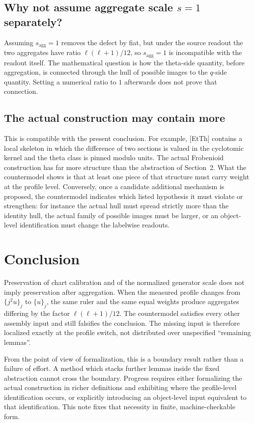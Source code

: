 \documentclass[11pt]{article}
\theoremstyle{definition}
\begin{document}
\subsection{Why not assume aggregate scale $s=1$ separately?}

Assuming $s_{\mathrm{agg}}=1$ removes the defect by fiat, but
under the source readout the two aggregates have ratio
$\ell(\ell+1)/12$, so $s_{\mathrm{agg}}=1$ is incompatible with
the readout itself.  The mathematical question is how the
theta-side quantity, before aggregation, is connected through
the hull of possible images to the $q$-side quantity.  Setting
a numerical ratio to $1$ afterwards does not prove that
connection.

\subsection{The actual construction may contain more}

This is compatible with the present conclusion.  For example,
[EtTh] contains a local skeleton in which the difference of two
sections is valued in the cyclotomic kernel and the theta class
is pinned modulo units.  The actual Frobenioid construction has
far more structure than the abstraction of Section~2.  What the
countermodel shows is that at least one piece of that structure
must carry weight at the profile level.  Conversely, once a
candidate additional mechanism is proposed, the countermodel
indicates which listed hypothesis it must violate or strengthen:
for instance the actual hull must spread strictly more than the
identity hull, the actual family of possible images must be
larger, or an object-level identification must change the
labelwise readouts.

\section{Conclusion}

Preservation of chart calibration and of the normalized
generator scale does not imply preservation after aggregation.
When the measured profile changes from $\{j^2u\}_j$ to
$\{u\}_j$, the same ruler and the same equal weights produce
aggregates differing by the factor $\ell(\ell+1)/12$.  The
countermodel satisfies every other assembly input and still
falsifies the conclusion.  The missing input is therefore
localized exactly at the profile switch, not distributed over
unspecified ``remaining lemmas''.

From the point of view of formalization, this is a boundary
result rather than a failure of effort.  A method which stacks
further lemmas inside the fixed abstraction cannot cross the
boundary.  Progress requires either formalizing the actual
construction in richer definitions and exhibiting where the
profile-level identification occurs, or explicitly introducing
an object-level input equivalent to that identification.  This
note fixes that necessity in finite, machine-checkable form.
\end{document}
